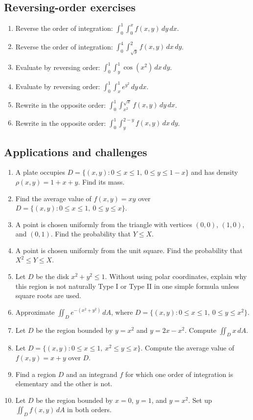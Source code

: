 \documentclass[11pt]{article}
\begin{document}
\subsection*{Reversing-order exercises}
\begin{enumerate}[start=17]
  \item Reverse the order of integration: $\int_0^1\int_0^x f(x,y)\,dy\,dx$.
  \item Reverse the order of integration: $\int_0^4\int_{\sqrt y}^{2} f(x,y)\,dx\,dy$.
  \item Evaluate by reversing order: $\int_0^1\int_y^1\cos(x^2)\,dx\,dy$.
  \item Evaluate by reversing order: $\int_0^1\int_x^1e^{y^2}\,dy\,dx$.
  \item Rewrite in the opposite order: $\int_0^1\int_{x^2}^{\sqrt x}f(x,y)\,dy\,dx$.
  \item Rewrite in the opposite order: $\int_0^1\int_y^{2-y}f(x,y)\,dx\,dy$.
\end{enumerate}

\subsection*{Applications and challenges}
\begin{enumerate}[start=23]
  \item A plate occupies $D=\{(x,y):0\le x\le1,\ 0\le y\le1-x\}$ and has density $\rho(x,y)=1+x+y$. Find its mass.
  \item Find the average value of $f(x,y)=xy$ over $D=\{(x,y):0\le x\le1,\ 0\le y\le x\}$.
  \item A point is chosen uniformly from the triangle with vertices $(0,0)$, $(1,0)$, and $(0,1)$. Find the probability that $Y\le X$.
  \item A point is chosen uniformly from the unit square. Find the probability that $X^2\le Y\le X$.
  \item Let $D$ be the disk $x^2+y^2\le1$. Without using polar coordinates, explain why this region is not naturally Type I or Type II in one simple formula unless square roots are used.
  \item Approximate $\iint_D e^{-(x^2+y^2)}\,dA$, where $D=\{(x,y):0\le x\le1,\ 0\le y\le x^2\}$.
  \item Let $D$ be the region bounded by $y=x^2$ and $y=2x-x^2$. Compute $\iint_D x\,dA$.
  \item Let $D=\{(x,y):0\le x\le1,\ x^2\le y\le x\}$. Compute the average value of $f(x,y)=x+y$ over $D$.
  \item Find a region $D$ and an integrand $f$ for which one order of integration is elementary and the other is not.
  \item Let $D$ be the region bounded by $x=0$, $y=1$, and $y=x^2$. Set up $\iint_D f(x,y)\,dA$ in both orders.
\end{enumerate}
\end{document}
